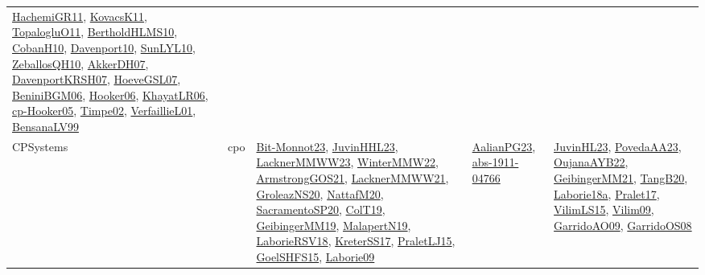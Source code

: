 {\begin{longtable}{lp{3cm}>{\raggedright}p{6cm}>{\raggedright}p{6cm}p{8cm}}
\href{articles/HachemiGR11.pdf}{HachemiGR11}\cite{HachemiGR11}, \href{articles/KovacsK11.pdf}{KovacsK11}\cite{KovacsK11}, \href{articles/TopalogluO11.pdf}{TopalogluO11}\cite{TopalogluO11}, \href{papers/BertholdHLMS10.pdf}{BertholdHLMS10}\cite{BertholdHLMS10}, \href{papers/CobanH10.pdf}{CobanH10}\cite{CobanH10}, \href{papers/Davenport10.pdf}{Davenport10}\cite{Davenport10}, \href{papers/SunLYL10.pdf}{SunLYL10}\cite{SunLYL10}, \href{articles/ZeballosQH10.pdf}{ZeballosQH10}\cite{ZeballosQH10}, \href{papers/AkkerDH07.pdf}{AkkerDH07}\cite{AkkerDH07}, \href{papers/DavenportKRSH07.pdf}{DavenportKRSH07}\cite{DavenportKRSH07}, \href{papers/HoeveGSL07.pdf}{HoeveGSL07}\cite{HoeveGSL07}, \href{papers/BeniniBGM06.pdf}{BeniniBGM06}\cite{BeniniBGM06}, \href{articles/Hooker06.pdf}{Hooker06}\cite{Hooker06}, \href{articles/KhayatLR06.pdf}{KhayatLR06}\cite{KhayatLR06}, \href{papers/cp-Hooker05.pdf}{cp-Hooker05}\cite{cp-Hooker05}, \href{articles/Timpe02.pdf}{Timpe02}\cite{Timpe02}, \href{papers/VerfaillieL01.pdf}{VerfaillieL01}\cite{VerfaillieL01}, \href{articles/BensanaLV99.pdf}{BensanaLV99}\cite{BensanaLV99}\\
CPSystems & cpo & \href{papers/Bit-Monnot23.pdf}{Bit-Monnot23}\cite{Bit-Monnot23}, \href{papers/JuvinHHL23.pdf}{JuvinHHL23}\cite{JuvinHHL23}, \href{articles/LacknerMMWW23.pdf}{LacknerMMWW23}\cite{LacknerMMWW23}, \href{papers/WinterMMW22.pdf}{WinterMMW22}\cite{WinterMMW22}, \href{papers/ArmstrongGOS21.pdf}{ArmstrongGOS21}\cite{ArmstrongGOS21}, \href{papers/LacknerMMWW21.pdf}{LacknerMMWW21}\cite{LacknerMMWW21}, \href{papers/GroleazNS20.pdf}{GroleazNS20}\cite{GroleazNS20}, \href{papers/NattafM20.pdf}{NattafM20}\cite{NattafM20}, \href{articles/SacramentoSP20.pdf}{SacramentoSP20}\cite{SacramentoSP20}, \href{papers/ColT19.pdf}{ColT19}\cite{ColT19}, \href{papers/GeibingerMM19.pdf}{GeibingerMM19}\cite{GeibingerMM19}, \href{papers/MalapertN19.pdf}{MalapertN19}\cite{MalapertN19}, \href{articles/LaborieRSV18.pdf}{LaborieRSV18}\cite{LaborieRSV18}, \href{articles/KreterSS17.pdf}{KreterSS17}\cite{KreterSS17}, \href{papers/PraletLJ15.pdf}{PraletLJ15}\cite{PraletLJ15}, \href{articles/GoelSHFS15.pdf}{GoelSHFS15}\cite{GoelSHFS15}, \href{papers/Laborie09.pdf}{Laborie09}\cite{Laborie09} & \href{papers/AalianPG23.pdf}{AalianPG23}\cite{AalianPG23}, \href{articles/abs-1911-04766.pdf}{abs-1911-04766}\cite{abs-1911-04766} & \href{papers/JuvinHL23.pdf}{JuvinHL23}\cite{JuvinHL23}, \href{papers/PovedaAA23.pdf}{PovedaAA23}\cite{PovedaAA23}, \href{papers/OujanaAYB22.pdf}{OujanaAYB22}\cite{OujanaAYB22}, \href{papers/GeibingerMM21.pdf}{GeibingerMM21}\cite{GeibingerMM21}, \href{papers/TangB20.pdf}{TangB20}\cite{TangB20}, \href{papers/Laborie18a.pdf}{Laborie18a}\cite{Laborie18a}, \href{papers/Pralet17.pdf}{Pralet17}\cite{Pralet17}, \href{papers/VilimLS15.pdf}{VilimLS15}\cite{VilimLS15}, \href{papers/Vilim09.pdf}{Vilim09}\cite{Vilim09}, \href{articles/GarridoAO09.pdf}{GarridoAO09}\cite{GarridoAO09}, \href{articles/GarridoOS08.pdf}{GarridoOS08}\cite{GarridoOS08}\\

\end{longtable}}
